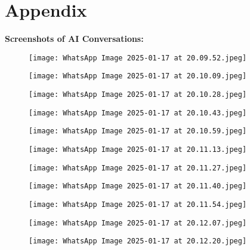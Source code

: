 \documentclass[a4paper,landscape]{article}
\begin{document}
\section{Appendix}
\textbf{Screenshots of AI Conversations:}
\begin{figure}[H]
    \centering
    \texttt{[image: WhatsApp Image 2025-01-17 at 20.09.52.jpeg]} %
    \caption{}
    \label{fig:}
\end{figure}
\begin{figure}[H]
    \centering
    \texttt{[image: WhatsApp Image 2025-01-17 at 20.10.09.jpeg]} %
    \caption{}
    \label{fig:}
\end{figure}
\begin{figure}[H]
    \centering
    \texttt{[image: WhatsApp Image 2025-01-17 at 20.10.28.jpeg]} %
    \caption{}
    \label{fig:}
\end{figure}
\begin{figure}[H]
    \centering
    \texttt{[image: WhatsApp Image 2025-01-17 at 20.10.43.jpeg]} %
    \caption{}
    \label{fig:}
\end{figure}
\begin{figure}[H]
    \centering
    \texttt{[image: WhatsApp Image 2025-01-17 at 20.10.59.jpeg]} %
    \caption{}
    \label{fig:}
\end{figure}
\begin{figure}[H]
    \centering
    \texttt{[image: WhatsApp Image 2025-01-17 at 20.11.13.jpeg]} %
    \caption{}
    \label{fig:}
\end{figure}
\begin{figure}[H]
    \centering
    \texttt{[image: WhatsApp Image 2025-01-17 at 20.11.27.jpeg]} %
    \caption{}
    \label{fig:}
\end{figure}
\begin{figure}[H]
    \centering
    \texttt{[image: WhatsApp Image 2025-01-17 at 20.11.40.jpeg]} %
    \caption{}
    \label{fig:}
\end{figure}
\begin{figure}[H]
    \centering
    \texttt{[image: WhatsApp Image 2025-01-17 at 20.11.54.jpeg]} %
    \caption{}
    \label{fig:}
\end{figure}
\begin{figure}[H]
    \centering
    \texttt{[image: WhatsApp Image 2025-01-17 at 20.12.07.jpeg]} %
    \caption{}
    \label{fig:}
\end{figure}
\begin{figure}[H]
    \centering
    \texttt{[image: WhatsApp Image 2025-01-17 at 20.12.20.jpeg]} %
    \caption{}
    \label{fig:}
\end{figure}
\end{document}
